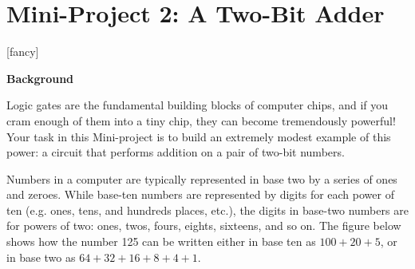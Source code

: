 \section*{Mini-Project 2: A Two-Bit Adder}
\label{lab_proportional_controller}

[fancy]{%
	\fancyhead[LO,RE]{}
}
\pagestyle{interlude}


\bigskip

\textbf{Background}

Logic gates are the fundamental building blocks of computer chips, and if you cram enough of them into a tiny chip, they can become tremendously powerful!  Your task in this Mini-project is to build an extremely modest example of this power: a circuit that performs addition on a pair of two-bit numbers.

Numbers in a computer are typically represented in base two by a series of ones and zeroes.  While base-ten numbers are represented by digits for each power of ten (e.g. ones, tens, and hundreds places, etc.), the digits in base-two numbers are for powers of two: ones, twos, fours, eights, sixteens, and so on.  The figure below shows how the number 125 can be written either in base ten as $100 + 20 + 5$, or in base two as $64 + 32+16+8+4+1$.

